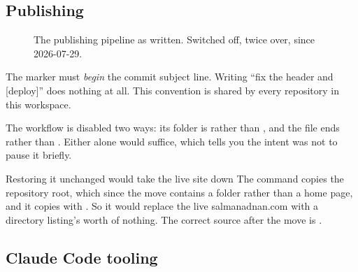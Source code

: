 \documentclass[11pt,a4paper]{article}
\begin{document}
\subsection{Publishing}

\begin{figure}[H]\centering
{}
\caption{The publishing pipeline as written. Switched off, twice over, since
2026-07-29.}
\end{figure}

The \code{[deploy]} marker must \emph{begin} the commit subject line. Writing ``fix
the header and [deploy]'' does nothing at all. This convention is shared by every
repository in this workspace.

The workflow is disabled two ways: its folder is 
rather than , and the file ends  rather than
. Either alone would suffice, which tells you the intent was not to pause
it briefly.

\begin{honest}{Restoring it unchanged would take the live site down}
The  command copies the repository root, which since the move contains a
folder rather than a home page, and it copies with . So it would
replace the live salmanadnan.com with a directory listing's worth of nothing. The
correct source after the move is .
\end{honest}

\subsection{Claude Code tooling}
\end{document}
